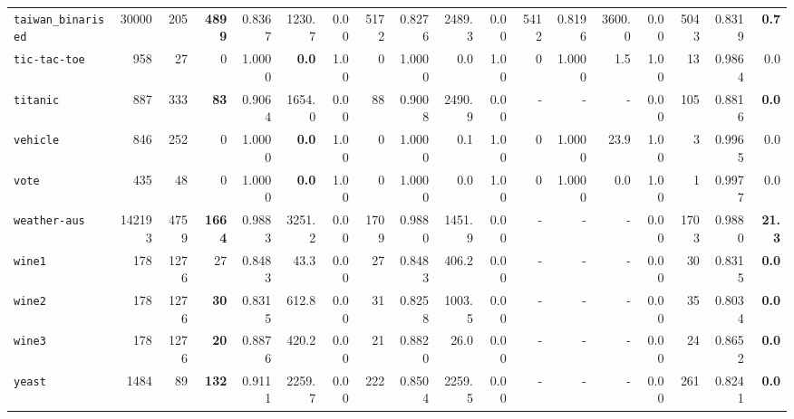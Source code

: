 \begin{tabular}{lccrrrrrrrrrrrrrrr}
\texttt{taiwan\_binarised} & \multicolumn{1}{r}{30000} & \multicolumn{1}{r}{205}  & \textbf{4899} & 0.8367 & 1230.7 & 0.00 & 5172 & 0.8276 & 2489.3 & 0.00 & 5412 & 0.8196 & 3600.0 & 0.00 & 5043 & 0.8319 & \textbf{0.7}\\
\texttt{tic-tac-toe} & \multicolumn{1}{r}{958} & \multicolumn{1}{r}{27}  & 0 & 1.0000 & \textbf{0.0} & 1.00 & 0 & 1.0000 & 0.0 & 1.00 & 0 & 1.0000 & 1.5 & 1.00 & 13 & 0.9864 & 0.0\\
\texttt{titanic} & \multicolumn{1}{r}{887} & \multicolumn{1}{r}{333}  & \textbf{83} & 0.9064 & 1654.0 & 0.00 & 88 & 0.9008 & 2490.9 & 0.00 & - & - & - & 0.00 & 105 & 0.8816 & \textbf{0.0}\\
\texttt{vehicle} & \multicolumn{1}{r}{846} & \multicolumn{1}{r}{252}  & 0 & 1.0000 & \textbf{0.0} & 1.00 & 0 & 1.0000 & 0.1 & 1.00 & 0 & 1.0000 & 23.9 & 1.00 & 3 & 0.9965 & 0.0\\
\texttt{vote} & \multicolumn{1}{r}{435} & \multicolumn{1}{r}{48}  & 0 & 1.0000 & \textbf{0.0} & 1.00 & 0 & 1.0000 & 0.0 & 1.00 & 0 & 1.0000 & 0.0 & 1.00 & 1 & 0.9977 & 0.0\\
\texttt{weather-aus} & \multicolumn{1}{r}{142193} & \multicolumn{1}{r}{4759}  & \textbf{1664} & 0.9883 & 3251.2 & 0.00 & 1709 & 0.9880 & 1451.9 & 0.00 & - & - & - & 0.00 & 1703 & 0.9880 & \textbf{21.3}\\
\texttt{wine1} & \multicolumn{1}{r}{178} & \multicolumn{1}{r}{1276}  & 27 & 0.8483 & 43.3 & 0.00 & 27 & 0.8483 & 406.2 & 0.00 & - & - & - & 0.00 & 30 & 0.8315 & \textbf{0.0}\\
\texttt{wine2} & \multicolumn{1}{r}{178} & \multicolumn{1}{r}{1276}  & \textbf{30} & 0.8315 & 612.8 & 0.00 & 31 & 0.8258 & 1003.5 & 0.00 & - & - & - & 0.00 & 35 & 0.8034 & \textbf{0.0}\\
\texttt{wine3} & \multicolumn{1}{r}{178} & \multicolumn{1}{r}{1276}  & \textbf{20} & 0.8876 & 420.2 & 0.00 & 21 & 0.8820 & 26.0 & 0.00 & - & - & - & 0.00 & 24 & 0.8652 & \textbf{0.0}\\
\texttt{yeast} & \multicolumn{1}{r}{1484} & \multicolumn{1}{r}{89}  & \textbf{132} & 0.9111 & 2259.7 & 0.00 & 222 & 0.8504 & 2259.5 & 0.00 & - & - & - & 0.00 & 261 & 0.8241 & \textbf{0.0}\\
\bottomrule
\end{tabular}

